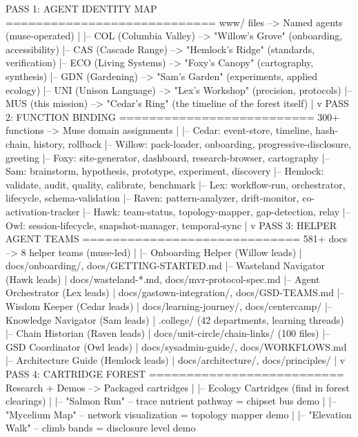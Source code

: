 \documentclass[11pt,letterpaper]{article}
\begin{document}
\begin{asciibox}
PASS 1: AGENT IDENTITY MAP
============================
  www/ files --> Named agents (muse-operated)
    |
    |-- COL (Columbia Valley) --> "Willow's Grove" (onboarding, accessibility)
    |-- CAS (Cascade Range) --> "Hemlock's Ridge" (standards, verification)
    |-- ECO (Living Systems) --> "Foxy's Canopy" (cartography, synthesis)
    |-- GDN (Gardening) --> "Sam's Garden" (experiments, applied ecology)
    |-- UNI (Unison Language) --> "Lex's Workshop" (precision, protocols)
    |-- MUS (this mission) --> "Cedar's Ring" (the timeline of the forest itself)
    |
    v
PASS 2: FUNCTION BINDING
==========================
  300+ functions --> Muse domain assignments
    |
    |-- Cedar: event-store, timeline, hash-chain, history, rollback
    |-- Willow: pack-loader, onboarding, progressive-disclosure, greeting
    |-- Foxy: site-generator, dashboard, research-browser, cartography
    |-- Sam: brainstorm, hypothesis, prototype, experiment, discovery
    |-- Hemlock: validate, audit, quality, calibrate, benchmark
    |-- Lex: workflow-run, orchestrator, lifecycle, schema-validation
    |-- Raven: pattern-analyzer, drift-monitor, co-activation-tracker
    |-- Hawk: team-status, topology-mapper, gap-detection, relay
    |-- Owl: session-lifecycle, snapshot-manager, temporal-sync
    |
    v
PASS 3: HELPER AGENT TEAMS
=============================
  581+ docs --> 8 helper teams (muse-led)
    |
    |-- Onboarding Helper (Willow leads)
    |       docs/onboarding/, docs/GETTING-STARTED.md
    |-- Wasteland Navigator (Hawk leads)
    |       docs/wasteland-*.md, docs/mvr-protocol-spec.md
    |-- Agent Orchestrator (Lex leads)
    |       docs/gastown-integration/, docs/GSD-TEAMS.md
    |-- Wisdom Keeper (Cedar leads)
    |       docs/learning-journey/, docs/centercamp/
    |-- Knowledge Navigator (Sam leads)
    |       .college/ (42 departments, learning threads)
    |-- Chain Historian (Raven leads)
    |       docs/unit-circle/chain-links/ (100 files)
    |-- GSD Coordinator (Owl leads)
    |       docs/sysadmin-guide/, docs/WORKFLOWS.md
    |-- Architecture Guide (Hemlock leads)
    |       docs/architecture/, docs/principles/
    |
    v
PASS 4: CARTRIDGE FOREST
==========================
  Research + Demos --> Packaged cartridges
    |
    |-- Ecology Cartridges (find in forest clearings)
    |     |-- "Salmon Run" -- trace nutrient pathway = chipset bus demo
    |     |-- "Mycelium Map" -- network visualization = topology mapper demo
    |     |-- "Elevation Walk" -- climb bands = disclosure level demo

\end{asciibox}
\end{document}
